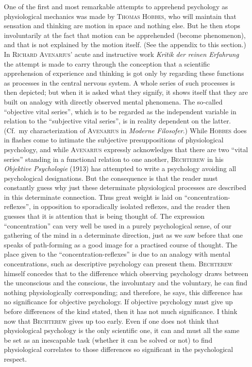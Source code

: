 \documentclass[12pt]{book}
\newcommand{\opage}[1]{\marginnote{\footnotesize\textit{[#1]}}}
\begin{document}
One of the first and most remarkable attempts to apprehend psychology as
physiological mechanics was made by \textsc{Thomas Hobbes}, who will maintain that
sensation and thinking are motion in space and nothing else. But he then stops
involuntarily at the fact that motion can be apprehended (become phenomenon), and
that is not explained by the motion itself. (See the appendix to this section.) In
\textsc{Richard Avenarius}' acute and instructive work \textit{Kritik der reinen
Erfahrung} the attempt is made to carry through the conception that a scientific
apprehension of experience and thinking is got only by regarding these functions
as processes in the central nervous system. A whole series of such processes is
then depicted; but when it is asked what they signify, it shows itself that they
are built on analogy with directly observed mental phenomena. The so-called
``objective vital series'', which is to be regarded as the independent variable in
relation to the ``subjective vital series'', is in reality dependent on the
latter. (Cf.\ my characterization of \textsc{Avenarius} in \textit{Moderne
Filosofer}.) While \textsc{Hobbes} does in flashes come to intimate the subjective
presuppositions of physiological psychology, and while \textsc{Avenarius}
expressly acknowledges that there are two ``vital series'' standing in a functional
relation to one another, \textsc{Bechterew} in his \textit{Objektive Psychologie}
(1913) has attempted to write a psychology avoiding all psychological
designations. But the consequence is that the reader must constantly guess why
just these \opage{115}determinate physiological processes are described in this determinate
connection. Thus great weight is laid on ``concentration-reflexes'', in opposition
to sporadically isolated reflexes, and the reader then guesses that it is
attention that is being thought of. The expression ``concentration'' can very well
be used in a purely psychological sense, of our gathering of the mind in a
determinate direction, just as we saw before that one speaks of path-forming as a
good image for a practised course of thought. The place given to the
``concentration-reflexes'' is due to an analogy with mental concentrations, such as
descriptive psychology can present them. \textsc{Bechterew} himself concedes that
to the difference which observing psychology draws between the unconscious and the
conscious, the involuntary and the voluntary, he can find nothing physiologically
corresponding; and therefore, he says, this difference has no significance for
objective psychology. If objective psychology must give up before differences of
the kind stated, then it has not much significance. I think now that
\textsc{Bechterew} gives up too early. Even if one does not think that
physiological psychology is the only scientific one, it can and must all the same
be set as an inescapable task (whether it can be solved or not) to find
physiological correlates to those differences so significant in the psychological
respect.
\end{document}
